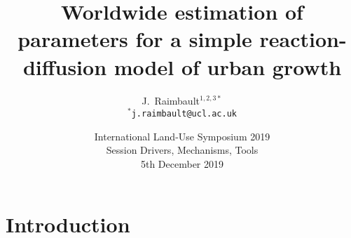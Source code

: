 



\title[]{Worldwide estimation of parameters for a simple reaction-diffusion model of urban growth}
\author[J. Raimbault]{J.~Raimbault$^{1,2,3\ast}$\\\medskip
$^{\ast}$\texttt{j.raimbault@ucl.ac.uk}
}





\date[5th December 2019]{International Land-Use Symposium 2019\\
Session Drivers, Mechanisms, Tools\\
5th December 2019
}

\frame{\maketitle}









\section{Introduction}





